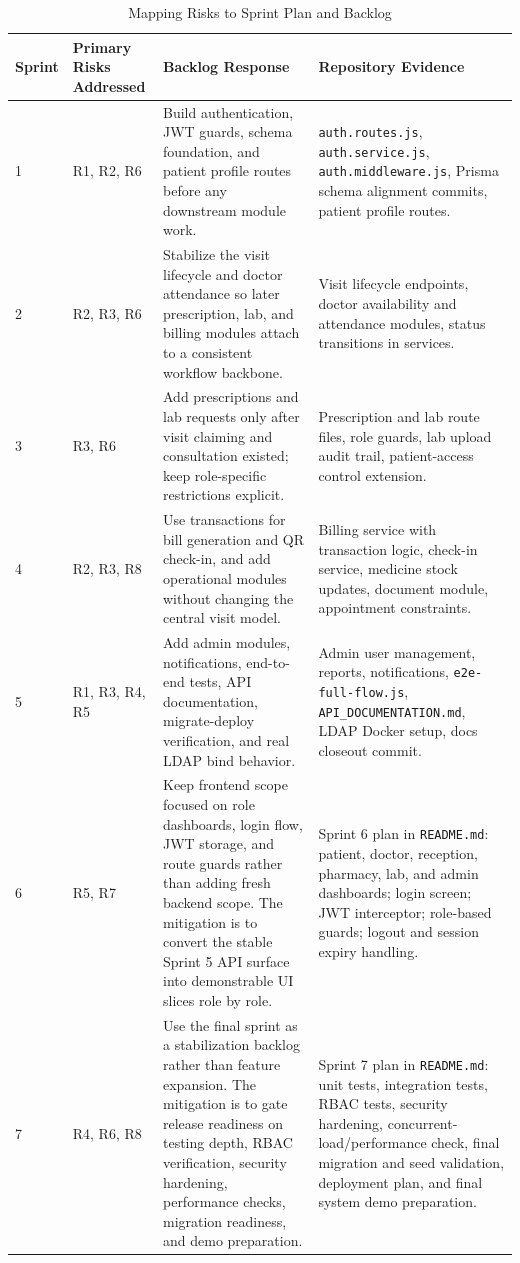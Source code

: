 \documentclass[conference]{IEEEtran}
\begin{document}
\begin{table}[t]
\caption{Mapping Risks to Sprint Plan and Backlog}
\centering
\footnotesize
\begin{tabular}{p{1.0cm} p{3.2cm} p{4.7cm} p{6.3cm}}
\hline
\rowcolor{HeaderBlue}
\textbf{Sprint} & \textbf{Primary Risks Addressed} & \textbf{Backlog Response} & \textbf{Repository Evidence} \\
\hline
1 & R1, R2, R6 & Build authentication, JWT guards, schema foundation, and patient profile routes before any downstream module work. & \texttt{auth.routes.js}, \texttt{auth.service.js}, \texttt{auth.middleware.js}, Prisma schema alignment commits, patient profile routes. \\
2 & R2, R3, R6 & Stabilize the visit lifecycle and doctor attendance so later prescription, lab, and billing modules attach to a consistent workflow backbone. & Visit lifecycle endpoints, doctor availability and attendance modules, status transitions in services. \\
3 & R3, R6 & Add prescriptions and lab requests only after visit claiming and consultation existed; keep role-specific restrictions explicit. & Prescription and lab route files, role guards, lab upload audit trail, patient-access control extension. \\
4 & R2, R3, R8 & Use transactions for bill generation and QR check-in, and add operational modules without changing the central visit model. & Billing service with transaction logic, check-in service, medicine stock updates, document module, appointment constraints. \\
5 & R1, R3, R4, R5 & Add admin modules, notifications, end-to-end tests, API documentation, migrate-deploy verification, and real LDAP bind behavior. & Admin user management, reports, notifications, \texttt{e2e-full-flow.js}, \texttt{API\_DOCUMENTATION.md}, LDAP Docker setup, docs closeout commit. \\
6 & R5, R7 & Keep frontend scope focused on role dashboards, login flow, JWT storage, and route guards rather than adding fresh backend scope. The mitigation is to convert the stable Sprint 5 API surface into demonstrable UI slices role by role. & Sprint 6 plan in \texttt{README.md}: patient, doctor, reception, pharmacy, lab, and admin dashboards; login screen; JWT interceptor; role-based guards; logout and session expiry handling. \\
7 & R4, R6, R8 & Use the final sprint as a stabilization backlog rather than feature expansion. The mitigation is to gate release readiness on testing depth, RBAC verification, security hardening, performance checks, migration readiness, and demo preparation. & Sprint 7 plan in \texttt{README.md}: unit tests, integration tests, RBAC tests, security hardening, concurrent-load/performance check, final migration and seed validation, deployment plan, and final system demo preparation. \\
\hline
\end{tabular}
\label{tab:riskmap}
\end{table}
\end{document}
